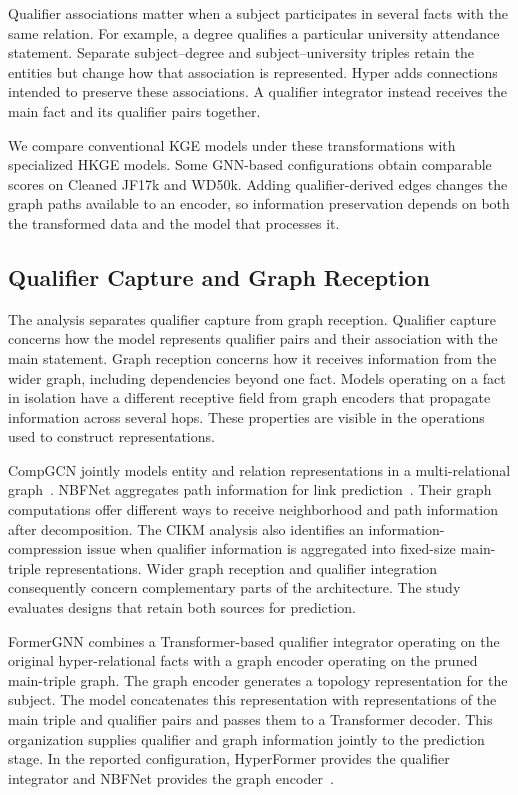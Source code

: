 Qualifier associations matter when a subject participates in several facts with the same relation. For example, a degree qualifies a particular university attendance statement. Separate subject--degree and subject--university triples retain the entities but change how that association is represented. Hyper adds connections intended to preserve these associations. A qualifier integrator instead receives the main fact and its qualifier pairs together.

We compare conventional KGE models under these transformations with specialized HKGE models. Some GNN-based configurations obtain comparable scores on Cleaned JF17k and WD50k. Adding qualifier-derived edges changes the graph paths available to an encoder, so information preservation depends on both the transformed data and the model that processes it.

\subsection{Qualifier Capture and Graph Reception}

The analysis separates qualifier capture from graph reception. Qualifier capture concerns how the model represents qualifier pairs and their association with the main statement. Graph reception concerns how it receives information from the wider graph, including dependencies beyond one fact. Models operating on a fact in isolation have a different receptive field from graph encoders that propagate information across several hops. These properties are visible in the operations used to construct representations.

CompGCN jointly models entity and relation representations in a multi-relational graph~\cite{bg-compgcn}. NBFNet aggregates path information for link prediction~\cite{bg-nbfnet}. Their graph computations offer different ways to receive neighborhood and path information after decomposition. The CIKM analysis also identifies an information-compression issue when qualifier information is aggregated into fixed-size main-triple representations. Wider graph reception and qualifier integration consequently concern complementary parts of the architecture. The study evaluates designs that retain both sources for prediction.

FormerGNN combines a Transformer-based qualifier integrator operating on the original hyper-relational facts with a graph encoder operating on the pruned main-triple graph. The graph encoder generates a topology representation for the subject. The model concatenates this representation with representations of the main triple and qualifier pairs and passes them to a Transformer decoder. This organization supplies qualifier and graph information jointly to the prediction stage. In the reported configuration, HyperFormer provides the qualifier integrator and NBFNet provides the graph encoder~\cite{bg-hyperformer,bg-nbfnet}.

